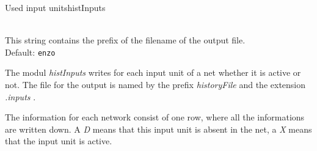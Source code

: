 \begin{moduledoc}{Used input units}{histInputs}
  \item[\KeyWord{historyFile} \optParam{ x } ]~\\
    This string contains the prefix of the filename of the output file.\\
    Default: {\tt enzo}
\end{moduledoc}
The modul {\it histInputs} writes for each input unit of a net whether it is
active or not.  The file for the output is named by the prefix
{\it historyFile} and the extension {\it .inputs} .

The information for each network consist of one row, where all the informations are
written down. A {\it D} means that this input unit is absent in the net, a
{\it X} means that the input unit is active.


